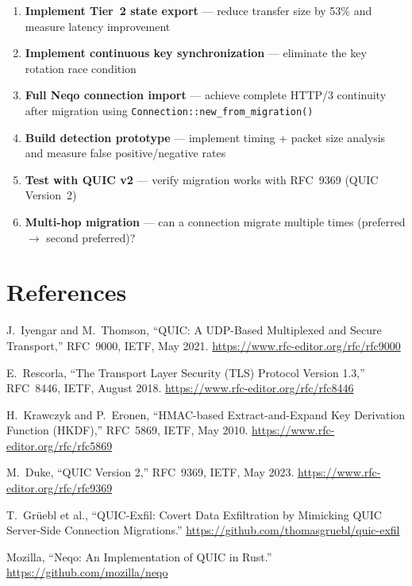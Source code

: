 \documentclass[11pt,a4paper]{article}
\begin{document}
\begin{enumerate}
    \item \textbf{Implement Tier~2 state export} --- reduce transfer size by 53\% and measure latency improvement
    \item \textbf{Implement continuous key synchronization} --- eliminate the key rotation race condition
    \item \textbf{Full Neqo connection import} --- achieve complete HTTP/3 continuity after migration using \texttt{Connection::new\_from\_migration()}
    \item \textbf{Build detection prototype} --- implement timing + packet size analysis and measure false positive/negative rates
    \item \textbf{Test with QUIC v2} --- verify migration works with RFC~9369 (QUIC Version~2)
    \item \textbf{Multi-hop migration} --- can a connection migrate multiple times (preferred $\rightarrow$ second preferred)?
\end{enumerate}

\newpage
\section*{References}

\begin{enumerate}[label={[\arabic*]}]
    \item J.~Iyengar and M.~Thomson, ``QUIC: A UDP-Based Multiplexed and Secure Transport,'' RFC~9000, IETF, May 2021. \url{https://www.rfc-editor.org/rfc/rfc9000}
    \item E.~Rescorla, ``The Transport Layer Security (TLS) Protocol Version 1.3,'' RFC~8446, IETF, August 2018. \url{https://www.rfc-editor.org/rfc/rfc8446}
    \item H.~Krawczyk and P.~Eronen, ``HMAC-based Extract-and-Expand Key Derivation Function (HKDF),'' RFC~5869, IETF, May 2010. \url{https://www.rfc-editor.org/rfc/rfc5869}
    \item M.~Duke, ``QUIC Version 2,'' RFC~9369, IETF, May 2023. \url{https://www.rfc-editor.org/rfc/rfc9369}
    \item T.~Gr\"uebl et al., ``QUIC-Exfil: Covert Data Exfiltration by Mimicking QUIC Server-Side Connection Migrations.'' \url{https://github.com/thomasgruebl/quic-exfil}
    \item Mozilla, ``Neqo: An Implementation of QUIC in Rust.'' \url{https://github.com/mozilla/neqo}
\end{enumerate}
\end{document}
